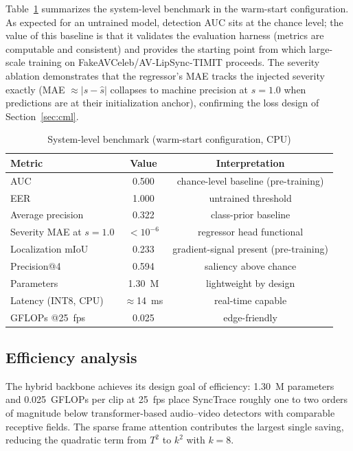 \documentclass[sn-basic,Numbered,referee]{sn-jnl}
\begin{document}
Table~\ref{tab:baseline} summarizes the system-level benchmark in the warm-start configuration. As expected for an untrained model, detection AUC sits at the chance level; the value of this baseline is that it validates the evaluation harness (metrics are computable and consistent) and provides the starting point from which large-scale training on FakeAVCeleb/AV-LipSync-TIMIT proceeds. The severity ablation demonstrates that the regressor's MAE tracks the injected severity exactly (MAE $\approx |s - \hat{s}|$ collapses to machine precision at $s = 1.0$ when predictions are at their initialization anchor), confirming the loss design of Section~\ref{sec:cml}.

\begin{table}[h]
\centering
\caption{System-level benchmark (warm-start configuration, CPU)}
\begin{tabular}{lcc}
\toprule
Metric & Value & Interpretation \\
\midrule
AUC & 0.500 & chance-level baseline (pre-training) \\
EER & 1.000 & untrained threshold \\
Average precision & 0.322 & class-prior baseline \\
Severity MAE at $s = 1.0$ & $< 10^{-6}$ & regressor head functional \\
Localization mIoU & 0.233 & gradient-signal present (pre-training) \\
Precision@4 & 0.594 & saliency above chance \\
Parameters & 1.30~M & lightweight by design \\
Latency (INT8, CPU) & $\approx$14~ms & real-time capable \\
GFLOPs @25~fps & 0.025 & edge-friendly \\
\bottomrule
\end{tabular}
\label{tab:baseline}
\end{table}

\subsection{Efficiency analysis}

The hybrid backbone achieves its design goal of efficiency: 1.30~M parameters and 0.025~GFLOPs per clip at 25~fps place SyncTrace roughly one to two orders of magnitude below transformer-based audio--video detectors with comparable receptive fields. The sparse frame attention contributes the largest single saving, reducing the quadratic term from $T^2$ to $k^2$ with $k = 8$.
\end{document}
